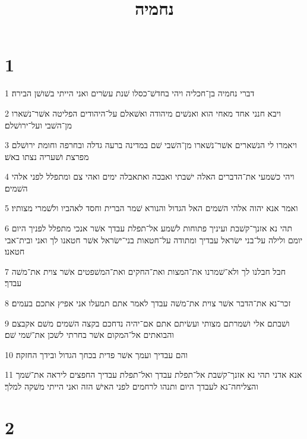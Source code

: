 

\title{נחמיה}


\chapter{1}

\par 1 דברי נחמיה בן־חכליה ויהי בחדשׁ־כסלו שׁנת עשׂרים ואני הייתי בשׁושׁן הבירה׃
\par 2 ויבא חנני אחד מאחי הוא ואנשׁים מיהודה ואשׁאלם על־היהודים הפליטה אשׁר־נשׁארו מן־השׁבי ועל־ירושׁלם׃
\par 3 ויאמרו לי הנשׁארים אשׁר־נשׁארו מן־השׁבי שׁם במדינה ברעה גדלה ובחרפה וחומת ירושׁלם מפרצת ושׁעריה נצתו באשׁ׃
\par 4 ויהי כשׁמעי את־הדברים האלה ישׁבתי ואבכה ואתאבלה ימים ואהי צם ומתפלל לפני אלהי השׁמים׃
\par 5 ואמר אנא יהוה אלהי השׁמים האל הגדול והנורא שׁמר הברית וחסד לאהביו ולשׁמרי מצותיו׃
\par 6 תהי נא אזנך־קשׁבת ועיניך פתוחות לשׁמע אל־תפלת עבדך אשׁר אנכי מתפלל לפניך היום יומם ולילה על־בני ישׂראל עבדיך ומתודה על־חטאות בני־ישׂראל אשׁר חטאנו לך ואני ובית־אבי חטאנו׃
\par 7 חבל חבלנו לך ולא־שׁמרנו את־המצות ואת־החקים ואת־המשׁפטים אשׁר צוית את־משׁה עבדך׃
\par 8 זכר־נא את־הדבר אשׁר צוית את־משׁה עבדך לאמר אתם תמעלו אני אפיץ אתכם בעמים׃
\par 9 ושׁבתם אלי ושׁמרתם מצותי ועשׂיתם אתם אם־יהיה נדחכם בקצה השׁמים משׁם אקבצם והבואתים אל־המקום אשׁר בחרתי לשׁכן את־שׁמי שׁם׃
\par 10 והם עבדיך ועמך אשׁר פדית בכחך הגדול ובידך החזקה׃
\par 11 אנא אדני תהי נא אזנך־קשׁבת אל־תפלת עבדך ואל־תפלת עבדיך החפצים ליראה את־שׁמך והצליחה־נא לעבדך היום ותנהו לרחמים לפני האישׁ הזה ואני הייתי משׁקה למלך׃

\chapter{2}

